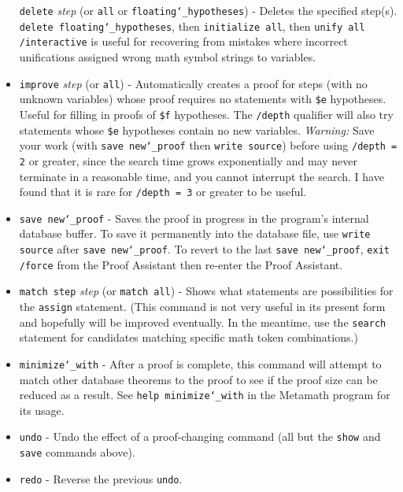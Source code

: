 \begin{itemize}
    \texttt{delete} {\em step} (or \texttt{all} or \texttt{floating{\char`\_}hypotheses}) -
        Deletes the specified
        step(s).  \texttt{delete floating{\char`\_}hypotheses}, then \texttt{initialize all}, then
        \texttt{unify all /interactive} is useful for recovering from mistakes
        where incorrect unifications assigned wrong math symbol strings to
        variables.
\item[]
    \texttt{improve} {\em step} (or \texttt{all}) -
      Automatically creates a proof for steps (with no unknown variables)
      whose proof requires no statements with \texttt{\$e} hypotheses.  Useful
      for filling in proofs of \texttt{\$f} hypotheses.  The \texttt{/depth}
      qualifier will also try statements whose \texttt{\$e} hypotheses contain
      no new variables.  {\em Warning:} Save your work (with \texttt{save
      new{\char`\_}proof} then \texttt{write source}) before using
      \texttt{/depth = 2} or greater, since the search time grows
      exponentially and may never terminate in a reasonable time, and you
      cannot interrupt the search.  I have found that it is rare for
      \texttt{/depth = 3} or greater to be useful.
 \item[]
    \texttt{save new{\char`\_}proof} - Saves the proof in progress in the program's
        internal database buffer.  To save it permanently into the database file,
        use \texttt{write source} after
        \texttt{save new{\char`\_}proof}.  To revert to the last
        \texttt{save new{\char`\_}proof},
        \texttt{exit /force} from the Proof Assistant then re-enter the Proof
        Assistant.
 \item[]
    \texttt{match step} {\em step} (or \texttt{match all}) - Shows what
        statements are
        possibilities for the \texttt{assign} statement. (This command
        is not very
        useful in its present form and hopefully will be improved
        eventually.  In the meantime, use the \texttt{search} statement for
        candidates matching specific math token combinations.)
 \item[]
 \texttt{minimize{\char`\_}with}
     - After a proof is complete, this command will attempt
        to match other database theorems to the proof to see if the proof
        size can be reduced as a result.  See \texttt{help
        minimize{\char`\_}with} in the
        Metamath program for its usage.
 \item[]
 \texttt{undo}
    - Undo the effect of a proof-changing command (all but the
      \texttt{show} and \texttt{save} commands above).
 \item[]
 \texttt{redo}
    - Reverse the previous \texttt{undo}.
\end{itemize}

